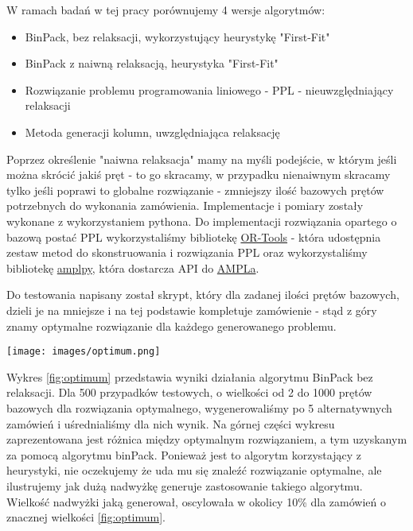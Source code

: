 W ramach badań w tej pracy porównujemy 4 wersje algorytmów:

\begin{itemize}
    \item BinPack, bez relaksacji, wykorzystujący heurystykę "First-Fit"
    \item BinPack z naiwną relaksacją, heurystyka "First-Fit"
    \item Rozwiązanie problemu programowania liniowego - PPL \cite{linear-programming-gilmore} - nieuwzględniający relaksacji
    \item Metoda generacji kolumn, uwzględniająca relaksację
\end{itemize}

Poprzez określenie "naiwna relaksacja" mamy na myśli podejście, w którym jeśli można skrócić jakiś pręt - to go skracamy, w przypadku nienaiwnym skracamy tylko jeśli poprawi to globalne rozwiązanie - zmniejszy ilość bazowych prętów potrzebnych do wykonania zamówienia. Implementacje i pomiary zostały wykonane z wykorzystaniem pythona. Do implementacji rozwiązania opartego o bazową postać PPL \cite{linear-programming-gilmore} wykorzystaliśmy bibliotekę \href{https://developers.google.com/optimization/introduction/python}{OR-Tools} - która udostępnia zestaw metod do skonstruowania i rozwiązania PPL oraz wykorzystaliśmy bibliotekę \href{https://amplpy.ampl.com/en/latest/}{amplpy}, która dostarcza API do \href{https://ampl.com/}{AMPLa}.

Do testowania napisany został skrypt, który dla zadanej ilości prętów bazowych, dzieli je na mniejsze i na tej podstawie kompletuje zamówienie - stąd z góry znamy optymalne rozwiązanie dla każdego generowanego problemu.

\begin{figure*}[!ht]
    \begin{center}
        \texttt{[image: images/optimum.png]}
    \end{center}
    \caption{Quality of BinPack algorithm, excess over optimal solution}
    \label{fig:optimum}
\end{figure*}

\FloatBarrier %

 Wykres \ref{fig:optimum} przedstawia wyniki działania algorytmu BinPack bez relaksacji. Dla 500 przypadków testowych, o wielkości od 2 do 1000 prętów bazowych dla rozwiązania optymalnego, wygenerowaliśmy po 5 alternatywnych zamówień i uśrednialiśmy dla nich wynik. Na górnej części wykresu zaprezentowana jest różnica między optymalnym rozwiązaniem, a tym uzyskanym za pomocą algorytmu binPack. Ponieważ jest to algorytm korzystający z heurystyki, nie oczekujemy że uda mu się znaleźć rozwiązanie optymalne, ale ilustrujemy jak dużą nadwyżkę generuje zastosowanie takiego algorytmu. Wielkość nadwyżki jaką generował, oscylowała w okolicy 10\% dla zamówień o znacznej wielkości \ref{fig:optimum}.
 
